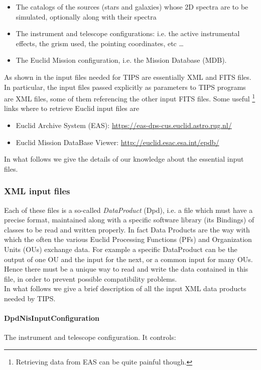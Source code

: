 \begin{itemize}
\item The catalogs of the sources (stars and galaxies) whose 2D spectra are to be simulated, optionally along with their spectra
\item The instrument and telescope configurations: i.e. the active instrumental effects, the grism used, the pointing coordinates, etc \dots
\item The Euclid Mission configuration, i.e. the Mission Database (MDB).
\end{itemize}

As shown in  the input files needed for TIPS are essentially XML and FITS files. In particular, the input files passed explicitly as parameters to TIPS programs are XML files, some of them referencing the other input FITS files. Some useful \footnote{Retrieving data from EAS can be quite painful though.} links where to retrieve Euclid input files are

\begin{itemize}
\item Euclid Archive System (EAS): \url{https://eas-dps-cus.euclid.astro.rug.nl/}
\item Euclid Mission DataBase Viewer: \url{http://euclid.esac.esa.int/epdb/}
\end{itemize}

In what follows we give the details of our knowledge about the essential input files.

\subsubsection{XML input files}
Each of these files is a so-called \emph{DataProduct} (Dpd), i.e. a file which must have a precise format, maintained along with a specific software library (its Bindings) of classes to be read and written properly. In fact Data Products are the way with which the often the various Euclid Processing Functions (PFs) and Organization Units (OUs) exchange data. For example a specific DataProduct can be the output of one OU and the input for the next, or a common input for many OUs. Hence there must be a unique way to read and write the data contained in this file, in order to prevent possible compatibility problems.\\
In what follows we give a brief description of all the input XML data products needed by TIPS.

\paragraph{DpdNisInputConfiguration} 
The instrument and telescope configuration. It controls:


